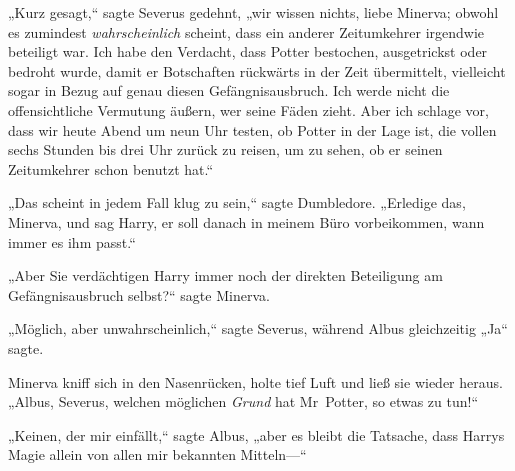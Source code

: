 „Kurz gesagt,“ sagte Severus gedehnt, „wir wissen nichts, liebe Minerva; obwohl es zumindest \emph{wahrscheinlich} scheint, dass ein anderer Zeitumkehrer irgendwie beteiligt war. Ich habe den Verdacht, dass Potter bestochen, ausgetrickst oder bedroht wurde, damit er Botschaften rückwärts in der Zeit übermittelt, vielleicht sogar in Bezug auf genau diesen Gefängnisausbruch. Ich werde nicht die offensichtliche Vermutung äußern, wer seine Fäden zieht. Aber ich schlage vor, dass wir heute Abend um neun Uhr testen, ob Potter in der Lage ist, die vollen sechs Stunden bis drei Uhr zurück zu reisen, um zu sehen, ob er seinen Zeitumkehrer schon benutzt hat.“

„Das scheint in jedem Fall klug zu sein,“ sagte Dumbledore. „Erledige das, Minerva, und sag Harry, er soll danach in meinem Büro vorbeikommen, wann immer es ihm passt.“

„Aber Sie verdächtigen Harry immer noch der direkten Beteiligung am Gefängnisausbruch selbst?“ sagte Minerva.

„Möglich, aber unwahrscheinlich,“ sagte Severus, während Albus gleichzeitig „Ja“ sagte.

Minerva kniff sich in den Nasenrücken, holte tief Luft und ließ sie wieder heraus. „Albus, Severus, welchen möglichen \emph{Grund} hat Mr~Potter, so etwas zu tun!“

„Keinen, der mir einfällt,“ sagte Albus, „aber es bleibt die Tatsache, dass Harrys Magie allein von allen mir bekannten Mitteln—“


